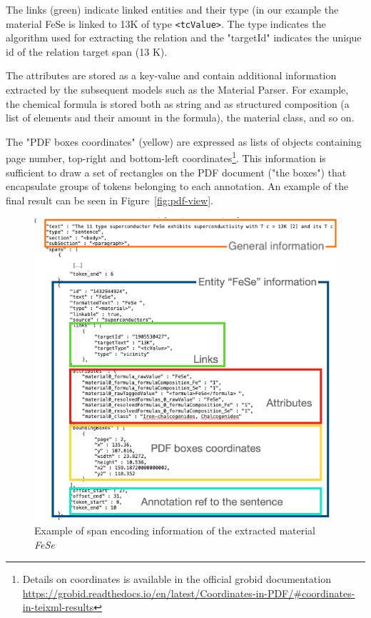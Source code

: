 \documentclass[a4paper]{article}
\begin{document}
The links (green) indicate linked entities and their type (in our example the material FeSe is linked to 13K of type \texttt{<tcValue>}. 
The type indicates the algorithm used for extracting the relation and the "targetId" indicates the unique id of the relation target span (13 K).

The attributes are stored as a key-value and contain additional information extracted by the subsequent models such as the Material Parser. For example, the chemical formula is stored both as string and as structured composition (a list of elements and their amount in the formula), the material class, and so on.

The "PDF boxes coordinates" (yellow) are expressed as lists of objects containing page number, top-right and bottom-left coordinates\footnote{Details on coordinates is available in the official grobid documentation \url{https://grobid.readthedocs.io/en/latest/Coordinates-in-PDF/\#coordinates-in-teixml-results}}. This information is sufficient to draw a set of rectangles on the PDF document ("the boxes") that encapsulate groups of tokens belonging to each annotation. An example of the final result can be seen in Figure~\ref{fig:pdf-view}.

\begin{figure}[htbp]
  \centering
  \includegraphics[width=1\textwidth]{images/data-flow-2} 
  \caption{Example of span encoding information of the extracted material \textit{FeSe}}
  \label{fig:data-flow-2}
\end{figure}
\end{document}
